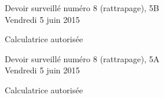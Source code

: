 \documentclass[a4paper,10pt]{article}
\begin{document}







\begin{feuilleDS}{Devoir surveillé numéro 8 (rattrapage), 5B\\ \small Vendredi  5 juin 2015}
    \begin{center}
        Calculatrice autorisée
    \end{center}
\vspace{1cm}


\end{feuilleDS}


\begin{feuilleDS}{Devoir surveillé numéro 8 (rattrapage), 5A\\ \small Vendredi  5 juin 2015}
    \begin{center}
        Calculatrice autorisée
    \end{center}
\vspace{1cm}


\end{feuilleDS}
\end{document}
